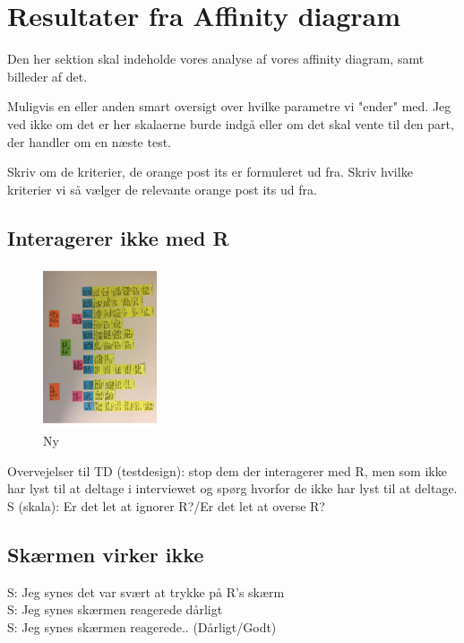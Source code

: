 \section{Resultater fra Affinity diagram}
\label{ParametreDatabehandlingAffinityDiagram}
%
Den her sektion skal indeholde vores analyse af vores affinity diagram, samt billeder af det. 

Muligvis en eller anden smart oversigt over hvilke parametre vi "ender" med. Jeg ved ikke om det er her skalaerne burde indgå eller om det skal vente til den part, der handler om en næste test. 

Skriv om de kriterier, de orange post its er formuleret ud fra. Skriv hvilke kriterier vi så vælger de relevante orange post its ud fra. 

\subsection{Interagerer ikke med R}
%

%
\begin{figure}[H]
\centering
\includegraphics[width = 0.3\textwidth]{Figure/AffinityDiagram/InteragererIkkeMedR} 
\caption{Ny}
\label{fig:AFInteragererIkkeMedR}
\end{figure}
\noindent
%
Overvejelser til TD (testdesign): stop dem der interagerer med R, men som ikke har lyst til at deltage i interviewet og spørg hvorfor de ikke har lyst til at deltage. \\
S (skala): Er det let at ignorer R?/Er det let at overse R?

\subsection{Skærmen virker ikke}
%
S: Jeg synes det var svært at trykke på R's skærm\\
S: Jeg synes skærmen reagerede dårligt\\
S: Jeg synes skærmen reagerede.. (Dårligt/Godt)\\

